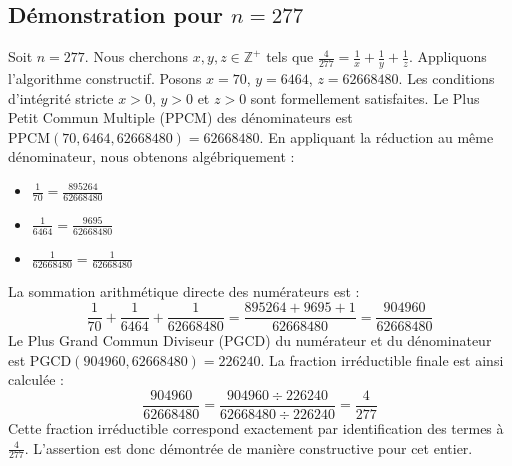 \documentclass[11pt,a4paper]{article}
\begin{document}
\subsection{Démonstration pour $n = 277$}
Soit $n = 277$. Nous cherchons $x, y, z \in \mathbb{Z}^{+}$ tels que $\frac{4}{277} = \frac{1}{x} + \frac{1}{y} + \frac{1}{z}$.
Appliquons l'algorithme constructif. Posons $x = 70$, $y = 6464$, $z = 62668480$.
Les conditions d'intégrité stricte $x > 0$, $y > 0$ et $z > 0$ sont formellement satisfaites.
Le Plus Petit Commun Multiple (PPCM) des dénominateurs est $\text{PPCM}(70, 6464, 62668480) = 62668480$.
En appliquant la réduction au même dénominateur, nous obtenons algébriquement :
\begin{itemize}
    \item $\frac{1}{70} = \frac{895264}{62668480}$
    \item $\frac{1}{6464} = \frac{9695}{62668480}$
    \item $\frac{1}{62668480} = \frac{1}{62668480}$
\end{itemize}
La sommation arithmétique directe des numérateurs est :
$$ \frac{1}{70} + \frac{1}{6464} + \frac{1}{62668480} = \frac{895264 + 9695 + 1}{62668480} = \frac{904960}{62668480} $$
Le Plus Grand Commun Diviseur (PGCD) du numérateur et du dénominateur est $\text{PGCD}(904960, 62668480) = 226240$.
La fraction irréductible finale est ainsi calculée :
$$ \frac{904960}{62668480} = \frac{904960 \div 226240}{62668480 \div 226240} = \frac{4}{277} $$
Cette fraction irréductible correspond exactement par identification des termes à $\frac{4}{277}$. L'assertion est donc démontrée de manière constructive pour cet entier.
\end{document}
